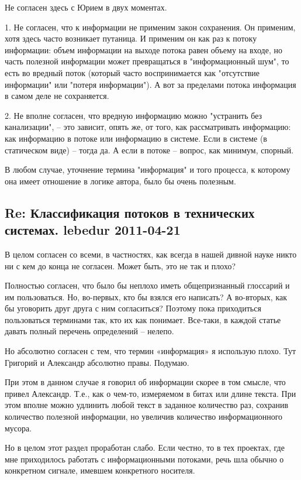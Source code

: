 \documentclass[a4paper,11pt]{article}
\begin{document}
Не согласен здесь с Юрием в двух моментах.

1. Не согласен, что к информации не применим закон сохранения. Он применим,
хотя здесь часто возникает путаница. И применим он как раз к потоку
информации: объем информации на выходе потока равен объему на входе, но часть
полезной информации может превращаться в "информационный шум", то есть во
вредный поток (который часто воспринимается как "отсутствие информации" или
"потеря информации"). А вот за пределами потока информация в самом деле не
сохраняется.

2. Не вполне согласен, что вредную информацию можно "устранить без
канализации", -- это зависит, опять же, от того, как рассматривать информацию:
как информацию в потоке или информацию в системе. Если в системе (в
статическом виде) -- тогда да. А если в потоке -- вопрос, как минимум,
спорный.

В любом случае, уточнение термина "информация" и того процесса, к которому она
имеет отношение в логике автора, было бы очень полезным.

\subsection*{Re: Классификация потоков в технических системах.  lebedur
  2011-04-21} 

В целом согласен со всеми, в частностях, как всегда в нашей дивной науке никто
ни с кем до конца не согласен. Может быть, это не так и плохо?

Полностью согласен, что было бы неплохо иметь общепризнанный глоссарий и им
пользоваться. Но, во-первых, кто бы взялся его написать? А во-вторых, как бы
уговорить друг друга с ним согласиться? Поэтому пока приходиться пользоваться
терминами так, кто их как понимает. Все-таки, в каждой статье давать полный
перечень определений – нелепо.

Но абсолютно согласен с тем, что термин «информация» я использую плохо. Тут
Григорий и Александр абсолютно правы. Подумаю.

При этом в данном случае я говорил об информации скорее в том смысле, что
привел Александр. Т.е., как о чем-то, измеряемом в битах или длине текста. При
этом вполне можно удлинить любой текст в заданное количество раз, сохранив
количество полезной информации, но увеличив количество информационного мусора.

Но в целом этот раздел проработан слабо. Если честно, то в тех проектах, где
мне приходилось работать с информационными потоками, речь шла обычно о
конкретном сигнале, имевшем конкретного носителя.
\end{document}
